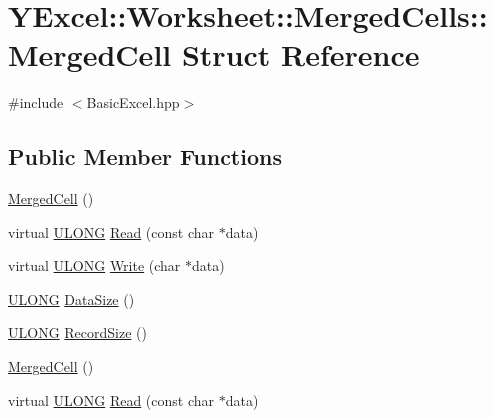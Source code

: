 \hypertarget{struct_y_excel_1_1_worksheet_1_1_merged_cells_1_1_merged_cell}{}\section{Y\+Excel\+:\+:Worksheet\+:\+:Merged\+Cells\+:\+:Merged\+Cell Struct Reference}
\label{struct_y_excel_1_1_worksheet_1_1_merged_cells_1_1_merged_cell}


{\ttfamily \#include $<$Basic\+Excel.\+hpp$>$}

\subsection*{Public Member Functions}
\begin{DoxyCompactItemize}
\item 
\hyperlink{struct_y_excel_1_1_worksheet_1_1_merged_cells_1_1_merged_cell_a1b2a87e9ab556cb2acbfb4a8495df87f}{Merged\+Cell} ()
\item 
virtual \hyperlink{_basic_excel_8hpp_abe09d1bea023be6a07cbadde8e955435}{U\+L\+O\+N\+G} \hyperlink{struct_y_excel_1_1_worksheet_1_1_merged_cells_1_1_merged_cell_a127ef5c80c5364c50f70362dbbdd926c}{Read} (const char $\ast$data)
\item 
virtual \hyperlink{_basic_excel_8hpp_abe09d1bea023be6a07cbadde8e955435}{U\+L\+O\+N\+G} \hyperlink{struct_y_excel_1_1_worksheet_1_1_merged_cells_1_1_merged_cell_abef64d8cf0c289ee54f964f10409cf3f}{Write} (char $\ast$data)
\item 
\hyperlink{_basic_excel_8hpp_abe09d1bea023be6a07cbadde8e955435}{U\+L\+O\+N\+G} \hyperlink{struct_y_excel_1_1_worksheet_1_1_merged_cells_1_1_merged_cell_a4bab55ae34b4b4b44f8b418cebefc6f1}{Data\+Size} ()
\item 
\hyperlink{_basic_excel_8hpp_abe09d1bea023be6a07cbadde8e955435}{U\+L\+O\+N\+G} \hyperlink{struct_y_excel_1_1_worksheet_1_1_merged_cells_1_1_merged_cell_a225dee90b812da5fd308b2df43a82c75}{Record\+Size} ()
\item 
\hyperlink{struct_y_excel_1_1_worksheet_1_1_merged_cells_1_1_merged_cell_a1b2a87e9ab556cb2acbfb4a8495df87f}{Merged\+Cell} ()
\item 
virtual \hyperlink{_basic_excel_8hpp_abe09d1bea023be6a07cbadde8e955435}{U\+L\+O\+N\+G} \hyperlink{struct_y_excel_1_1_worksheet_1_1_merged_cells_1_1_merged_cell_a4d4b445e41f50eb8dfc5ae8bcc361954}{Read} (const char $\ast$data)
\item 

\end{DoxyCompactItemize}
